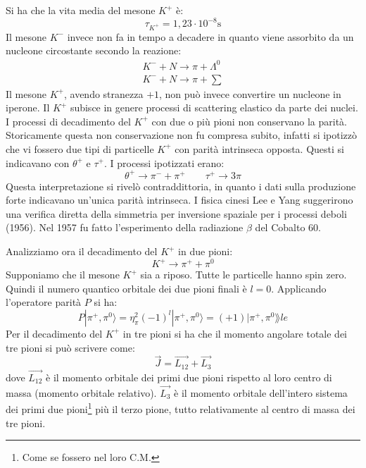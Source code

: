 Si ha che la vita media del mesone $K^+$ è:
\[
\tau_{K^+}=1,23\cdot 10^{-8}\si{\second}
\]
Il mesone $K^-$ invece non fa in tempo a decadere in quanto viene assorbito da 
un nucleone circostante secondo la reazione:
\begin{gather}
K^-+N\rightarrow \pi+\Lambda^0\\
K^-+N\rightarrow \pi+\sum
\end{gather}
Il mesone $K^+$, avendo stranezza $+1$, non può invece convertire un nucleone 
in iperone.
Il $K^+$ subisce in genere processi di scattering elastico da parte dei nuclei.
I processi di decadimento del $K^+$ con due o più pioni non conservano la 
parità.
Storicamente questa non conservazione non fu compresa subito, infatti si 
ipotizzò che vi fossero due tipi
di particelle $K^+$ con parità intrinseca opposta.
Questi si indicavano con $\theta^+$ e $\tau^+$. I processi ipotizzati erano:
\[
\theta^+\rightarrow \pi^-+\pi^+\qquad \tau^+\rightarrow 3\pi
\]
Questa interpretazione si rivelò contraddittoria, in quanto i dati sulla 
produzione forte indicavano un'unica
parità intrinseca. I fisica cinesi Lee e Yang suggerirono una verifica diretta 
della simmetria per inversione
spaziale per i processi deboli (1956).
Nel 1957 fu fatto l'esperimento della radiazione $\beta$ del Cobalto 60.

Analizziamo ora il decadimento del $K^+$ in due pioni:
\[
K^+\rightarrow \pi^++\pi^0
\]
Supponiamo che il mesone $K^+$ sia a riposo. Tutte le particelle hanno spin 
zero.
Quindi il numero quantico orbitale dei due pioni finali è $l=0$. Applicando 
l'operatore parità $P$ si ha:
\begin{equation}
P|\pi^+,\pi^0\rangle=\eta_{\pi}^2(-1)^l|\pi^+,\pi^0\rangle=(+1)|\pi^+,\pi^0\rang
le
\end{equation}
Per il decadimento del $K^+$ in tre pioni si ha che il momento angolare totale 
dei tre pioni si può scrivere come:
\begin{equation}
\vec{J}=\vec{L_{12}}+\vec{L_3}
\end{equation}
dove $\vec{L_{12}}$ è il momento orbitale dei primi due pioni rispetto al loro 
centro di massa (momento orbitale relativo).
$\vec{L_3}$ è il momento orbitale dell'intero sistema dei primi due 
pioni\footnote{Come se fossero nel loro C.M.}
più il terzo pione, tutto relativamente al centro di massa dei tre pioni.

